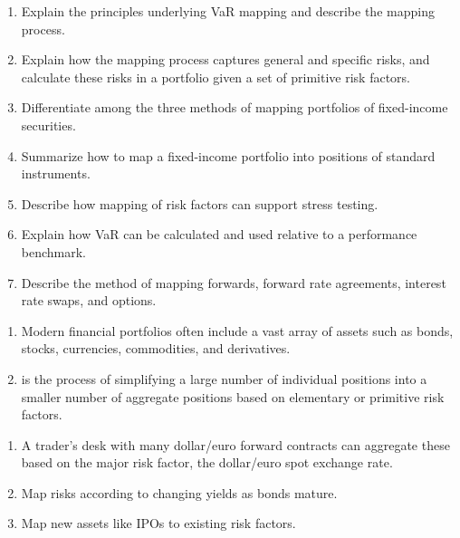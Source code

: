 
\begin{mrkeybox}[title={Learning objectives in this reading}]
\small
\begin{enumerate}[label=\textbf{\alph*.},leftmargin=1.7em]
\item Explain the principles underlying VaR mapping and describe the mapping process.
\item Explain how the mapping process captures general and specific risks, and calculate these
      risks in a portfolio given a set of primitive risk factors.
\item Differentiate among the three methods of mapping portfolios of fixed-income securities.
\item Summarize how to map a fixed-income portfolio into positions of standard instruments.
\item Describe how mapping of risk factors can support stress testing.
\item Explain how VaR can be calculated and used relative to a performance benchmark.
\item Describe the method of mapping forwards, forward rate agreements, interest rate swaps,
      and options.
\end{enumerate}
\end{mrkeybox}


\begin{enumerate}[label=\textbf{\alph*)}]
\item Modern financial portfolios often include a vast array of assets such as bonds, stocks,
      currencies, commodities, and derivatives.
\item {} is the process of simplifying a large number of individual positions into a
      smaller number of aggregate positions based on elementary or primitive risk factors.
\end{enumerate}

\begin{mrexbox}[title={Examples}]
\begin{enumerate}
\item {} A trader's desk with many dollar/euro forward contracts can
      aggregate these based on the major risk factor, the dollar/euro spot exchange rate.
\item {} Map risks according to changing yields as bonds mature.
\item {} Map new assets like IPOs to existing risk factors.
\end{enumerate}
\end{mrexbox}


